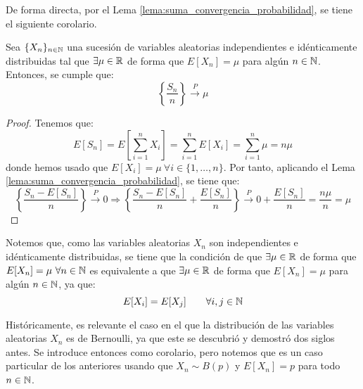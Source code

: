 De forma directa, por el Lema \ref{lema:suma_convergencia_probabilidad}, se tiene el siguiente corolario.
\begin{coro}
    Sea $\{X_n\}_{n\in \mathbb{N}}$ una sucesión de variables aleatorias independientes e idénticamente distribuidas tal que $\exists \mu\in \mathbb{R}$ de forma que $E[X_n]=\mu$ para algún $n\in \mathbb{N}$. Entonces, se cumple que:
    \begin{equation*}
        \left\{\frac{S_n}{n}\right\} \xrightarrow{P} \mu
    \end{equation*}
\end{coro}
\begin{proof}
    Tenemos que:
    \begin{equation*}
        E[S_n] = E\left[\sum_{i=1}^{n} X_i\right] = \sum_{i=1}^{n} E[X_i] = \sum_{i=1}^{n} \mu = n\mu
    \end{equation*}
    donde hemos usado que $E[X_i]=\mu~\forall i\in \{1,\ldots,n\}$. Por tanto, aplicando el Lema \ref{lema:suma_convergencia_probabilidad}, se tiene que:
    \begin{equation*}
        \left\{\frac{S_n-E[S_n]}{n}\right\} \xrightarrow{P} 0 \Longrightarrow 
        \left\{\frac{S_n-E[S_n]}{n}+\frac{E[S_n]}{n}\right\} \xrightarrow{P} 0+\frac{E[S_n]}{n}=\frac{n\mu}{n}=\mu
    \end{equation*}
\end{proof}
\begin{observacion}
    Notemos que, como las variables aleatorias $X_n$ son independientes e idénticamente distribuidas, se tiene que la condición de que $\exists \mu\in \mathbb{R}$ de forma que $E[X_n]=\mu~\forall n\in \mathbb{N}$ es equivalente a que $\exists \mu\in \mathbb{R}$ de forma que $E[X_n]=\mu$ para algún $n\in \mathbb{N}$, ya que:
    \begin{equation*}
        E[X_i]=E[X_j]\qquad \forall i,j\in \mathbb{N}
    \end{equation*}
\end{observacion}

Históricamente, es relevante el caso en el que la distribución de las variables aleatorias $X_n$ es de Bernoulli, ya que este se descubrió y demostró dos siglos antes. Se introduce entonces como corolario, pero notemos que es un caso particular de los anteriores usando que $X_n\sim B(p)$ y $E[X_n]=p$ para todo $n\in \mathbb{N}$.

